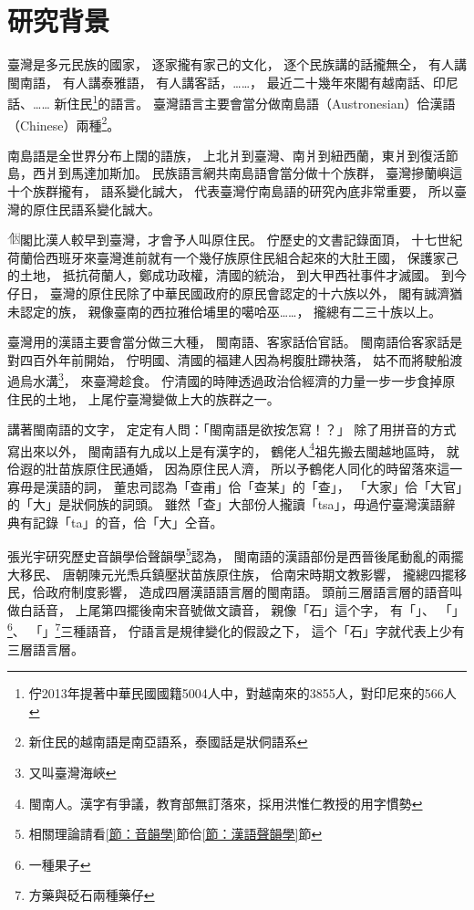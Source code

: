 \chapter{研究背景}
\label{章：研究背景}
臺灣是多元民族的國家，
逐家攏有家己的文化，
逐个民族講的話攏無仝，
有人講閩南語，
有人講泰雅語，
有人講客話，……，
最近二十幾年來閣有越南話、印尼話、……
新住民\footnote{佇2013年提著中華民國國籍5004人中，對越南來的3855人，對印尼來的566人\cite{國籍之歸化取得人數}}的語言。
臺灣語言主要會當分做南島語（Austronesian）佮漢語（Chinese）兩種\footnote{新住民的越南語是南亞語系，泰國話是狀侗語系}。

南島語是全世界分布上闊的語族\cite{臺灣原住民史李壬癸}，
上北爿到臺灣、南爿到紐西蘭，東爿到復活節島，西爿到馬達加斯加。
民族語言網\cite{Ethnologue}共南島語會當分做十个族群，
臺灣摻蘭嶼這十个族群攏有，
語系變化誠大，
代表臺灣佇南島語的研究內底非常重要，
所以臺灣的原住民語系變化誠大。

\includegraphics[height=1em]{字/⿰因}閣比漢人較早到臺灣，才會予人叫原住民。
佇歷史的文書記錄面頂，
十七世紀荷蘭佮西班牙來臺灣進前就有一个幾仔族原住民組合起來的大肚王國\cite{中研院民族所數位典藏大肚番王傳奇}，
保護家己的土地，
抵抗荷蘭人，鄭成功政權，清國的統治，
到大甲西社事件才滅國。
到今仔日，
臺灣的原住民除了中華民國政府的原民會認定的十六族以外，
閣有誠濟猶未認定的族，
親像臺南的西拉雅佮埔里的噶哈巫……，
攏總有二三十族以上。

臺灣用的漢語主要會當分做三大種，
閩南語、客家話佮官話\cite{外省族群的母語與國語}。
閩南語佮客家話是對四百外年前開始，
佇明國、清國的福建人因為枵腹肚蹛袂落，
姑不而將駛船渡過烏水溝\footnote{又叫臺灣海峽}，
來臺灣趁食。
佇清國的時陣透過政治佮經濟的力量一步一步食掉原住民的土地，
上尾佇臺灣變做上大的族群之一。

講著閩南語的文字，
定定有人問：「閩南語是欲按怎寫！？」
除了用拼音的方式寫出來以外，
閩南語有九成以上是有漢字的\cite{洪惟仁閩南語九成有漢字}，
鶴佬人\footnote{閩南人。漢字有爭議，教育部無訂落來，採用洪惟仁教授的用字慣勢}祖先搬去閩越地區時，
就佮遐的壯苗族原住民通婚，
因為原住民人濟，
所以予鶴佬人同化的時留落來這一寡毋是漢語的詞，
董忠司\cite{董忠司非漢語初探}認為「查甫」佮「查某」的「查」，
「大家」佮「大官」的「大」是狀侗族的詞頭。
雖然「查」大部份人攏讀「tsa」，毋過佇臺灣漢語辭典\cite{臺灣漢語辭典}有記錄「ta」的音，佮「大」仝音。

張光宇\cite{閩客方言史稿}研究歷史音韻學佮聲韻學\footnote{相關理論請看\ref{節：音韻學}節佮\ref{節：漢語聲韻學}節}認為，
閩南語的漢語部份是西晉後尾動亂的兩擺大移民、
唐朝陳元光𤆬兵鎮壓狀苗族原住族，
佮南宋時期文教影響，
攏總四擺移民，佮政府制度影響，
造成四層漢語語言層的閩南語。
頭前三層語言層的語音叫做白話音，
上尾第四擺後南宋音號做文讀音，
親像「石」這个字，
有「」、
「」\footnote{一種果子}、
「」\footnote{方藥與砭石兩種藥仔}三種語音，
佇語言是規律變化的假設之下，
這个「石」字就代表上少有三層語言層。

